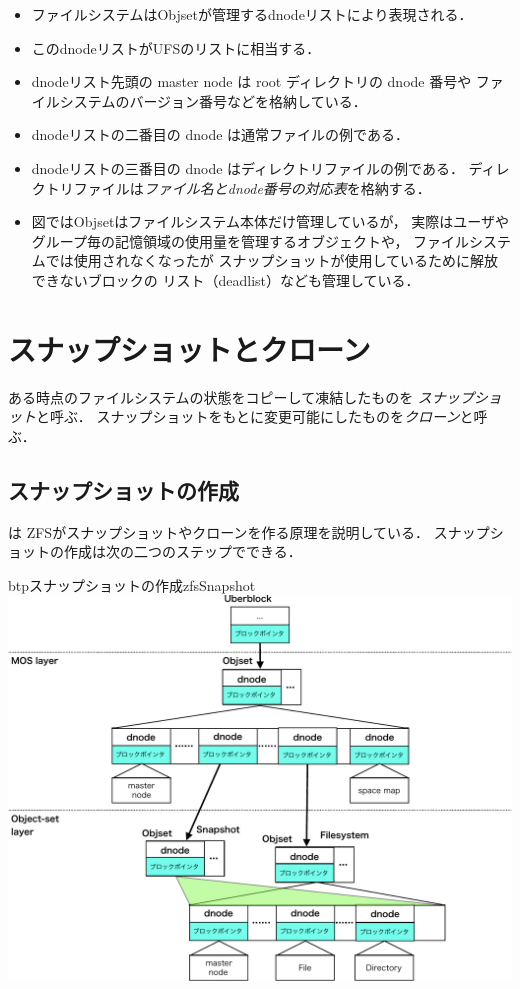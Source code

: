 \begin{itemize}
\item ファイルシステムはObjsetが管理するdnodeリストにより表現される．
\item このdnodeリストがUFSの{\inode}リストに相当する．
\item dnodeリスト先頭の master node は root ディレクトリの dnode 番号や
  ファイルシステムのバージョン番号などを格納している．
\item dnodeリストの二番目の dnode は通常ファイルの例である．
\item dnodeリストの三番目の dnode はディレクトリファイルの例である．
  ディレクトリファイルは\emph{ファイル名とdnode番号の対応表}を格納する．
\item 図ではObjsetはファイルシステム本体だけ管理しているが，
  実際はユーザやグループ毎の記憶領域の使用量を管理するオブジェクトや，
  ファイルシステムでは使用されなくなったが
  スナップショットが使用しているために解放できないブロックの
  リスト（deadlist）なども管理している．
\end{itemize}

\section{スナップショットとクローン}
ある時点のファイルシステムの状態をコピーして凍結したものを
\emph{スナップショット}と呼ぶ．
スナップショットをもとに変更可能にしたものを\emph{クローン}と呼ぶ．

\subsection{スナップショットの作成}
は
ZFSがスナップショットやクローンを作る原理を説明している．
スナップショットの作成は次の二つのステップでできる．

\begin{myfig}{btp}{スナップショットの作成}{zfsSnapshot}
  \centering\includegraphics[scale=0.7]{Fig/zfsSnapshot-crop.pdf}
\end{myfig}

